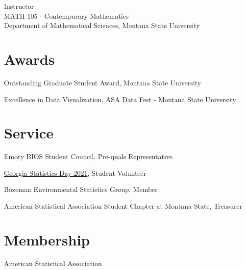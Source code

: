 \documentclass{wm_cv}
\begin{document}
Instructor \hfill {} \\ 
    \indent \quad MATH 105 - Contemporary Mathematics  \\
   \indent \quad Department of Mathematical Sciences, Montana State University

\section{Awards}

Outstanding Graduate Student Award, Montana State University \hfill {}  

Excellence in Data Visualization, ASA Data Fest - Montana State University \hfill  {}



\section{Service}

Emory BIOS Student Council, Pre-quals Representative \hfill  {}

\href{https://www.stat.uga.edu/events/content/2021/georgia-statistics-day-2021}{Georgia Statistics Day 2021}, Student Volunteer \hfill  {}

Bozeman Environmental Statistics Group, Member \hfill  {}

American Statistical Association Student Chapter at Montana State, Treasurer \hfill  {}

\section{Membership}

American Statistical Association \\
\end{document}
